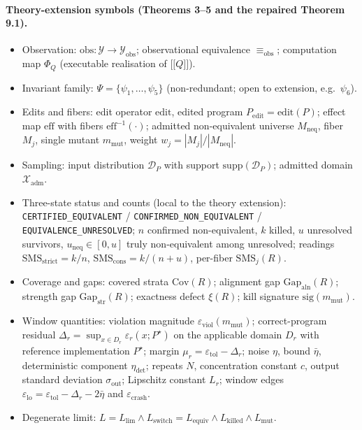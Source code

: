 \documentclass[manuscript,screen,review]{acmart}
\begin{document}
\paragraph{Theory-extension symbols (Theorems 3--5 and the repaired Theorem 9.1).}
\begin{itemize}
\item Observation: $\mathrm{obs} : \mathcal{Y} \to \mathcal{Y}_{\mathrm{obs}}$; observational equivalence $\equiv_{\mathrm{obs}}$; computation map $\Phi_Q$ (executable realisation of $\mathopen{\lbrack\!\lbrack} Q \mathclose{\rbrack\!\rbrack}$).
\item Invariant family: $\Psi = \{\psi_1, \dots, \psi_5\}$ (non-redundant; open to extension, e.g.\ $\psi_6$).
\item Edits and fibers: edit operator $\mathrm{edit}$, edited program $P_{\mathrm{edit}} = \mathrm{edit}(P)$; effect map $\mathrm{eff}$ with fibers $\mathrm{eff}^{-1}(\cdot)$; admitted non-equivalent universe $M_{\mathrm{neq}}$, fiber $M_j$, single mutant $m_{\mathrm{mut}}$, weight $w_j = |M_j|/|M_{\mathrm{neq}}|$.
\item Sampling: input distribution $\mathcal{D}_P$ with support $\mathrm{supp}(\mathcal{D}_P)$; admitted domain $\mathcal{X}_{\mathrm{adm}}$.
\item Three-state status and counts (local to the theory extension): \texttt{CERTIFIED\_EQUIVALENT} / \texttt{CONFIRMED\_NON\_EQUIVALENT} / \texttt{EQUIVALENCE\_UNRESOLVED}; $n$ confirmed non-equivalent, $k$ killed, $u$ unresolved survivors, $u_{\mathrm{neq}} \in [0,u]$ truly non-equivalent among unresolved; readings $\mathrm{SMS}_{\mathrm{strict}} = k/n$, $\mathrm{SMS}_{\mathrm{cons}} = k/(n+u)$, per-fiber $\mathrm{SMS}_j(R)$.
\item Coverage and gaps: covered strata $\mathrm{Cov}(R)$; alignment gap $\mathrm{Gap}_{\mathrm{aln}}(R)$; strength gap $\mathrm{Gap}_{\mathrm{str}}(R)$; exactness defect $\xi(R)$; kill signature $\mathrm{sig}(m_{\mathrm{mut}})$.
\item Window quantities: violation magnitude $\varepsilon_{\mathrm{viol}}(m_{\mathrm{mut}})$; correct-program residual $\Delta_r = \sup_{x \in D_r} \varepsilon_r(x; P^\star)$ on the applicable domain $D_r$ with reference implementation $P^\star$; margin $\mu_r = \varepsilon_{\mathrm{tol}} - \Delta_r$; noise $\eta$, bound $\bar\eta$, deterministic component $\eta_{\mathrm{det}}$; repeats $N$, concentration constant $c$, output standard deviation $\sigma_{\mathrm{out}}$; Lipschitz constant $L_r$; window edges $\varepsilon_{\mathrm{lo}} = \varepsilon_{\mathrm{tol}} - \Delta_r - 2\bar\eta$ and $\varepsilon_{\mathrm{crash}}$.
\item Degenerate limit: $L = L_{\mathrm{lim}} \wedge L_{\mathrm{switch}} = L_{\mathrm{equiv}} \wedge L_{\mathrm{killed}} \wedge L_{\mathrm{mut}}$.
\end{itemize}
\end{document}
